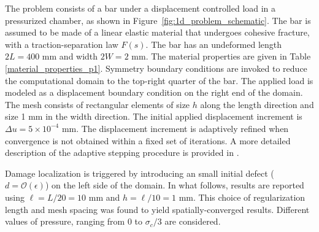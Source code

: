 

The problem consists of a bar under a displacement controlled load in a pressurized chamber, as shown in Figure~\ref{fig:1d_problem_schematic}. The bar is assumed to be made of a linear elastic material that undergoes cohesive fracture, with a traction-separation law $F(s)$.
The bar has an undeformed length $2L = 400$ mm and width $2W = 2$ mm. The material properties are given in Table \ref{material_properties_p1}. Symmetry boundary conditions are invoked to reduce the computational domain to the top-right quarter of the bar. The applied load is modeled as a displacement boundary condition on the right end of the domain. The mesh consists of rectangular elements of size $h$ along the length direction and size 1 mm in the width direction.
The initial applied displacement increment is $\Delta u = 5\times10^{-4}$ mm. The displacement increment is adaptively refined when convergence is not obtained within a fixed set of iterations.   A more detailed description of the adaptive stepping procedure is provided in \cite{gaston2009moose, permann2020moose, lindsay20222}. 

Damage localization is triggered by introducing an small initial defect ($d = \mathcal{O}(\epsilon)$) on the left side of the domain.  In what follows, results are reported using $\ell = L/20 = 10$ mm and $h = \ell/10 = 1$ mm.  This choice of regularization length and mesh spacing was found to yield spatially-converged results.  
Different values of pressure, ranging from $0$ to $\sigma_c/3$ are considered. 

